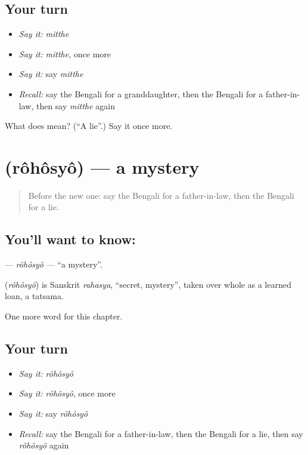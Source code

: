 \subsection*{Your turn}
\begin{itemize}
\raggedright
  \item \emph{Say it:} \emph{mitthe}
  \item \emph{Say it:} \emph{mitthe}, once more
  \item \emph{Say it:} say \emph{mitthe}
  \item \emph{Recall:} say the Bengali for a granddaughter, then the Bengali for a father-in-law, then say \emph{mitthe} again
\end{itemize}

\begin{tcolorbox}[breakable,colback=teal!4,colframe=teal!35!black,title={Before you move on}]
What does  mean? (\textquotedblleft{}A lie\textquotedblright{}.) Say it once more.
\end{tcolorbox}
\section[\texorpdfstring{\bn{রহস্য} (rôhôsyô)}{রহস্য (rôhôsyô)}]{ (rôhôsyô) — a mystery}

\label{lesson:BN-C253-rohosyo}



\begin{quote}
Before the new one: say the Bengali for a father-in-law, then the Bengali for a lie.
\end{quote}

\subsection*{You'll want to know: }
\textbf{} — \emph{rôhôsyô} — \textquotedblleft{}a mystery\textquotedblright{}.

\begin{cousinweb}
\textbf{} (\emph{rôhôsyô}) is Sanskrit \emph{rahasya}, \textquotedblleft{}secret, mystery\textquotedblright{}, taken over whole as a learned loan, a tatsama.
\end{cousinweb}

\begin{grammarlens}[title={What you've built}]
One more word for this chapter.
\end{grammarlens}

\subsection*{Your turn}
\begin{itemize}
\raggedright
  \item \emph{Say it:} \emph{rôhôsyô}
  \item \emph{Say it:} \emph{rôhôsyô}, once more
  \item \emph{Say it:} say \emph{rôhôsyô}
  \item \emph{Recall:} say the Bengali for a father-in-law, then the Bengali for a lie, then say \emph{rôhôsyô} again
\end{itemize}

